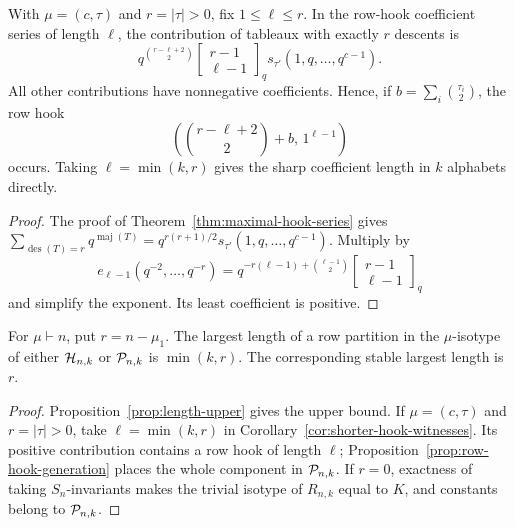 \begin{corollary}
\label{cor:shorter-hook-witnesses}
With $\mu=(c,\tau)$ and $r=|\tau|>0$, fix $1\le\ell\le r$.
In the row-hook coefficient series of length $\ell$, the contribution
of tableaux with exactly $r$ descents is
\[
 q^{\binom{r-\ell+2}{2}}
 \begin{bmatrix}r-1\\\ell-1\end{bmatrix}_q
                       s_{\tau'}(1,q,\ldots,q^{c-1}).
\]
All other contributions have nonnegative coefficients. Hence, if
$b=\sum_i\binom{\tau_i}{2}$, the row hook
\[
       \left(\binom{r-\ell+2}{2}+b,\,1^{\ell-1}\right)
\]
occurs. Taking $\ell=\min(k,r)$ gives the sharp coefficient length
in $k$ alphabets directly.
\end{corollary}
\begin{proof}
The proof of Theorem~\ref{thm:maximal-hook-series} gives
$\sum_{\operatorname{des}(T)=r}q^{\operatorname{maj}(T)}
=q^{r(r+1)/2}s_{\tau'}(1,q,\ldots,q^{c-1})$.
Multiply by
\[
 e_{\ell-1}(q^{-2},\ldots,q^{-r})
 =q^{-r(\ell-1)+\binom{\ell-1}{2}}
             \begin{bmatrix}r-1\\\ell-1\end{bmatrix}_q
\]
and simplify the exponent. Its least coefficient is positive.
\end{proof}




\begin{theorem}\label{thm:length}
For $\mu\vdash n$, put $r=n-\mu_1$.
The largest length of a row partition in the $\mu$-isotype of either
$\mathcal H_{n,k}$ or $\mathcal P_{n,k}$ is $\min(k,r)$.
The corresponding stable largest length is $r$.
\end{theorem}

\begin{proof}
Proposition~\ref{prop:length-upper} gives the upper bound. If
$\mu=(c,\tau)$ and $r=|\tau|>0$, take
$\ell=\min(k,r)$ in Corollary~\ref{cor:shorter-hook-witnesses}.
Its positive contribution contains a row hook of length $\ell$;
Proposition~\ref{prop:row-hook-generation} places the whole component
in $\mathcal P_{n,k}$. If $r=0$, exactness of taking $S_n$-invariants
makes the trivial isotype of $R_{n,k}$ equal to $K$, and constants
belong to $\mathcal P_{n,k}$.
\end{proof}

